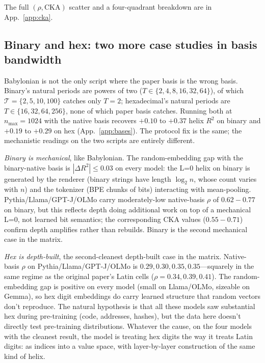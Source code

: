 \documentclass[10pt,letterpaper]{article}
\begin{document}
The full $(\rho, \text{CKA})$ scatter and a four-quadrant
breakdown are in App.~\ref{app:cka}.

\subsection{Binary and hex: two more case studies in basis bandwidth}
\label{sec:results-bases}

Babylonian is not the only script where the paper basis is the wrong
basis. Binary's natural periods are powers of two ($T \in
\{2,4,8,16,32,64\}$), of which $\mathcal{T} = \{2,5,10,100\}$
catches only $T = 2$; hexadecimal's natural periods are $T \in
\{16,32,64,256\}$, none of which paper basis catches. Running both
at $n_{\max} = 1024$ with the native basis recovers $+0.10$ to
$+0.37$ helix $R^2$ on binary and $+0.19$ to $+0.29$ on hex
(App.~\ref{app:bases}). The protocol fix is the same; the
mechanistic readings on the two scripts are entirely different.

\emph{Binary is mechanical}, like Babylonian. The random-embedding
gap with the binary-native basis is $|\Delta R^2| \le 0.03$ on every
model: the L=0 helix on binary is generated by the renderer (binary
strings have length $\log_2 n$, whose count varies with $n$) and the
tokenizer (BPE chunks of bits) interacting with mean-pooling.
Pythia/Llama/GPT-J/OLMo carry moderately-low native-basis $\rho$ of
$0.62{-}0.77$ on binary, but this reflects depth doing additional
work on top of a mechanical L=0, not learned bit semantics; the
corresponding CKA values ($0.55{-}0.71$) confirm depth amplifies
rather than rebuilds. Binary is the second mechanical case in the
matrix.

\emph{Hex is depth-built}, the second-cleanest depth-built case in
the matrix. Native-basis $\rho$ on Pythia/Llama/GPT-J/OLMo is
$0.29, 0.30, 0.35, 0.35$---squarely in the same regime as the
original paper's Latin cells ($\rho = 0.34, 0.39, 0.41$). The
random-embedding gap is positive on every model (small on
Llama/OLMo, sizeable on Gemma), so hex digit embeddings do carry
learned structure that random vectors don't reproduce. The natural
hypothesis is that all these models saw substantial hex during
pre-training (code, addresses, hashes), but the data here doesn't
directly test pre-training distributions. Whatever the cause, on the
four models with the cleanest result, the model is treating hex
digits the way it treats Latin digits: as indices into a value space,
with layer-by-layer construction of the same kind of helix.
\end{document}
